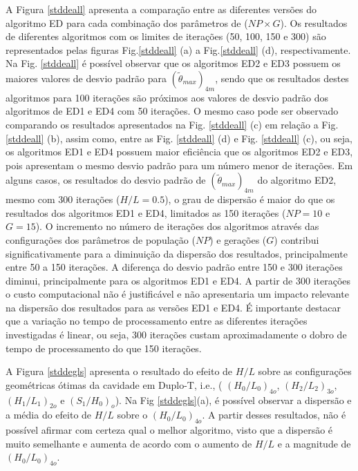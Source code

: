 \documentclass[12pt,A4,A4pt]{article}
\begin{document}
A Figura \ref{stddeall} apresenta a comparação entre as diferentes versões do algoritmo ED para cada combinação dos parâmetros de  ($NP \times G$). Os resultados de diferentes algoritmos com os limites de iterações (50, 100, 150 e 300) são representados pelas figuras Fig.\ref{stddeall} (a) a Fig.\ref{stddeall} (d), respectivamente. Na Fig. \ref{stddeall} é possível observar que os algoritmos ED2 e ED3 possuem os maiores valores de desvio padrão para $({\tilde{\theta}}_{max})_{4m}$, sendo que os resultados destes algoritmos para 100 iterações são próximos aos valores de desvio padrão dos algoritmos de ED1 e ED4 com 50 iterações. O mesmo caso pode ser observado comparando os resultados apresentados na Fig. \ref{stddeall} (c) em relação a Fig. \ref{stddeall} (b), assim como, entre as Fig. \ref{stddeall} (d) e Fig. \ref{stddeall} (c), ou seja, os algoritmos ED1 e ED4 possuem maior eficiência que os algoritmos ED2 e ED3, pois apresentam o mesmo desvio padrão para um número menor de iterações. Em alguns casos, os resultados do desvio padrão de $({\tilde{\theta}}_{max})_{4m}$ do algoritmo ED2, mesmo com 300 iterações ($H/L=0.5$), o grau de dispersão é maior do que os resultados dos algoritmos ED1 e ED4, limitados as 150 iterações ($NP=10$ e $G=15$). O incremento no número de iterações dos algoritmos através das configurações dos parâmetros de população ($NP$) e gerações ($G$) contribui significativamente para a diminuição da dispersão dos resultados, principalmente entre 50 a 150 iterações. A diferença do desvio padrão entre 150 e 300 iterações diminui, principalmente para os algoritmos ED1 e ED4. A partir de 300 iterações o custo computacional não é justificável e não apresentaria um impacto relevante na dispersão dos resultados para as versões ED1 e ED4. É importante destacar que a variação no tempo de processamento entre as diferentes iterações investigadas é linear, ou seja, 300 iterações custam aproximadamente o dobro de tempo de processamento do que 150 iterações.


\hspace{0.5cm} A Figura \ref{stddegls} apresenta o resultado do efeito de $H/L$ sobre as configurações geométricas ótimas da cavidade em Duplo-T, i.e., ( ${(H_{0}/L_{0})_{4o}}$,  ${(H_{2}/L_{2})_{3o}}$, ${(H_{1}/L_{1})_{2o}}$ e ${(S_{1}/H_{0})_{o}}$). Na Fig \ref{stddegls}(a), é possível observar a dispersão e a média do efeito de  $H/L$ sobre o ${(H_{0}/L_{0})_{4o}}$. A partir desses resultados, não é possível afirmar com certeza qual o melhor algoritmo, visto que a dispersão é muito semelhante e aumenta de acordo com o aumento de $H/L$ e a magnitude de ${(H_{0}/L_{0})_{4o}}$.
\end{document}
